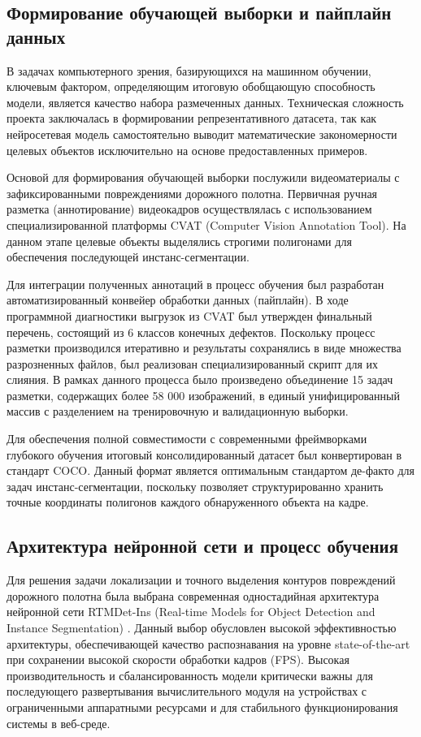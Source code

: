\documentclass[a4paper,12pt]{article}
\begin{document}
\subsection{Формирование обучающей выборки и пайплайн данных}

В задачах компьютерного зрения, базирующихся на машинном обучении, ключевым фактором, определяющим итоговую обобщающую способность модели, является качество набора размеченных данных. Техническая сложность проекта заключалась в формировании репрезентативного датасета, так как нейросетевая модель самостоятельно выводит математические закономерности целевых объектов исключительно на основе предоставленных примеров.

Основой для формирования обучающей выборки послужили видеоматериалы с зафиксированными повреждениями дорожного полотна. Первичная ручная разметка (аннотирование) видеокадров осуществлялась с использованием специализированной платформы CVAT (Computer Vision Annotation Tool). На данном этапе целевые объекты выделялись строгими полигонами для обеспечения последующей инстанс-сегментации.

Для интеграции полученных аннотаций в процесс обучения был разработан автоматизированный конвейер обработки данных (пайплайн). В ходе программной диагностики выгрузок из CVAT был утвержден финальный перечень, состоящий из 6 классов конечных дефектов. Поскольку процесс разметки производился итеративно и результаты сохранялись в виде множества разрозненных файлов, был реализован специализированный скрипт для их слияния. В рамках данного процесса было произведено объединение 15 задач разметки, содержащих более 58 000 изображений, в единый унифицированный массив с разделением на тренировочную и валидационную выборки.

Для обеспечения полной совместимости с современными фреймворками глубокого обучения итоговый консолидированный датасет был конвертирован в стандарт COCO. Данный формат является оптимальным стандартом де-факто для задач инстанс-сегментации, поскольку позволяет структурированно хранить точные координаты полигонов каждого обнаруженного объекта на кадре.

\subsection{Архитектура нейронной сети и процесс обучения}

Для решения задачи локализации и точного выделения контуров повреждений дорожного полотна была выбрана современная одностадийная архитектура нейронной сети RTMDet-Ins (Real-time Models for Object Detection and Instance Segmentation) \cite{lyu_rtmdet}. Данный выбор обусловлен высокой эффективностью архитектуры, обеспечивающей качество распознавания на уровне state-of-the-art при сохранении высокой скорости обработки кадров (FPS). Высокая производительность и сбалансированность модели критически важны для последующего развертывания вычислительного модуля на устройствах с ограниченными аппаратными ресурсами и для стабильного функционирования системы в веб-среде.
\end{document}

